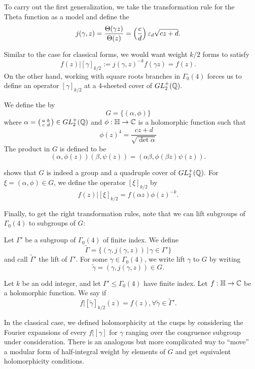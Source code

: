 \documentclass[12pt, a4paper]{report}
\begin{document}
To carry out the first generalization, we take the transformation rule for the
Theta function as a model and define the 
\[j(\gamma, z) = \frac{\Theta(\gamma z)}{\Theta(z)} =
  \left(\frac{c}{d}\right) \varepsilon_d \sqrt{cz + d}.\]

Similar to the case for classical forms, we would want weight $k/2$ forms to
satisfy
\[f(z)|[\gamma]_{k/2} := j(\gamma,z)^{-k}f(\gamma z) = f(z).\]
On the other hand, working with square roots branches in $\Gamma_0(4)$ forces us to
define an operator $[\gamma]_{k/2}$ at a 4-sheeted cover of $GL_2^+({\mathbb Q}).$

\begin{defn}
  We define the  by
  \[G = \{(\alpha, \phi )\}\]
  where $\alpha = \left(
    \begin{smallmatrix}
      a & b \\ c & d
    \end{smallmatrix}
\right) \in GL_2^+({\mathbb Q})$ and $\phi : \mathbb{H} \rightarrow {\mathbb C}$ is a holomorphic function such
that
\[\phi(z)^4 = \frac{cz+d}{\sqrt{\det \alpha}}\]
The product in $G$ is defined to be
\[(\alpha, \phi(z))(\beta, \psi(z)) = (\alpha \beta, \phi(\beta z) \psi(z)).\]
\end{defn}
\cite[Pages 179-180]{koblitz} shows that $G$ is indeed a group and a quadruple cover of 
$GL_2^+({\mathbb Q}).$
For $\xi = (\alpha, \phi) \in G$, we define the operator $[\xi]_{k/2}$ by
\[f(z) | [\xi]_{k/2} = f(\alpha z)\phi(z)^{-k}.\]

Finally, to get the right transformation rules, note that we can lift subgroups
of $\Gamma_0(4)$ to
subgroups of $G$:

Let $\Gamma'$ be a subgroup of $\Gamma_0(4)$ of finite index. We define
\[\tilde{\Gamma} = \{(\gamma, j(\gamma,z)) \, | \, \gamma \in \Gamma'\}\]
and call $\tilde{\Gamma}'$ the lift of $\Gamma'$. For some $\gamma \in
\Gamma_0(4)$, we write lift $\gamma$ to $G$ by writing
\[\tilde{\gamma} = (\gamma, j(\gamma,z)) \in G.\]

\begin{defn}
  Let $k$ be an odd integer, and let $\Gamma' \leq \Gamma_0(4)$ have finite index.
  Let $f : \mathbb{H} \rightarrow {\mathbb C}$ be a holomorphic function. We say  if
  \[f | [\tilde{\gamma}]_{k/2} (z) = f(z), \forall \tilde{\gamma} \in
    \tilde{\Gamma}'.\]
\end{defn}

In the classical case, we defined holomorphicity at the cusps by considering
the Fourier expansions of every $f | [\gamma]$ for $\gamma$ ranging over the
congruence subgroup under consideration. There is an analogous but more
complicated way to ``move'' a modular form of half-integral weight by elements
of $G$ and get equivalent holomorphicity conditions.
\end{document}
